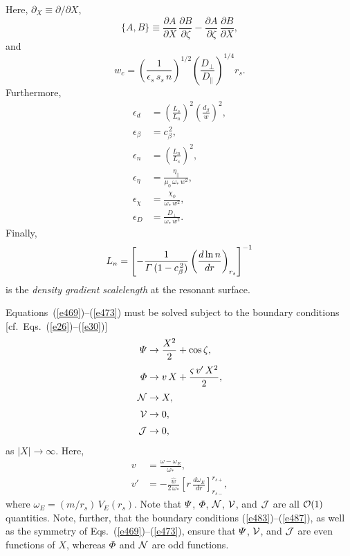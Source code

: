 \documentclass[12pt,prb,aps]{revtex4-1}
\begin{document}
Here,  $\partial_X\equiv \partial/\partial X$, 
\begin{equation}
\{A,B\} \equiv \frac{\partial A}{\partial X}\,\frac{\partial B}{\partial\zeta} - \frac{\partial A}{\partial \zeta}\,\frac{\partial B}{\partial X},
\end{equation}
and
\begin{equation}
w_c = \left(\frac{1}{\epsilon_s\,s_s\,n}\right)^{1/2}\left(\frac{D_\perp}{D_\parallel}\right)^{1/4}r_s.
\end{equation}
Furthermore,
\begin{align}
\epsilon_d &= \left(\frac{L_s}{L_n}\right)^2\left(\frac{d_\beta}{w}\right)^2,\label{e479}\\[0.5ex]
\epsilon_\beta &= c_\beta^{\,2},\label{e480}\\[0.5ex]
\epsilon_n&= \left(\frac{L_n}{L_s}\right)^2,\\[0.5ex]
\epsilon_\eta &= \frac{\eta_\parallel}{\mu_0\,\omega_\ast\,w^2},\label{e481}\\[0.5ex]
\epsilon_\chi &= \frac{\chi_\phi}{\omega_\ast\,w^2},\label{e482}\\[0.5ex]
\epsilon_D &= \frac{D_\perp}{\omega_\ast\,w^2}.
\end{align}
Finally,
\begin{equation}
L_n= \left[-\frac{1}{{\mit\Gamma}\,(1-c_\beta^{\,2})}\left(\frac{d\ln n}{dr}\right)_{r_s}\right]^{-1}
\end{equation}
is the {\em density gradient scalelength}\/  at the resonant surface. 

Equations~(\ref{e469})--(\ref{e473}) must be solved subject to the boundary conditions [cf.\ Eqs.~(\ref{e26})--(\ref{e30})] 
\begin{align}
{\mit\Psi}&\rightarrow \frac{X^{2}}{2} + \cos\zeta,\label{e483}\\[0.5ex]
{\mit\Phi} &\rightarrow v\,X +\frac{\varsigma\,v'\,X^{2}}{2},\label{e484}\\[0.5ex]
{\cal N}&\rightarrow X,\label{e486}\\[0.5ex]
{\cal V}&\rightarrow 0,\label{e486a}\\[0.5ex]
{\cal J}& \rightarrow 0,\label{e487}
\end{align}
as $|X|\rightarrow\infty$.  Here,
\begin{align}
v &= \frac{\omega-\omega_E}{\omega_\ast},\label{e488}\\[0.5ex]
v' &= -\frac{\hat{w}}{2\,\omega_\ast}\left[r\,\frac{d\omega_E}{dr}\right]_{r_{s-}}^{r_{s+}},\label{e489}
\end{align}
where $\omega_E= (m/r_s)\,V_E(r_s)$. 
Note that ${\mit\Psi}$, ${\mit\Phi}$, ${\cal N}$, ${\cal V}$, and ${\cal J}$ are all ${\cal O}(1)$ quantities.
Note, further,  that the boundary conditions (\ref{e483})--(\ref{e487}),
as well as the symmetry of Eqs.~(\ref{e469})--(\ref{e473}), ensure that ${\mit\Psi}$, ${\cal V}$, and
${\cal J}$ are even functions of $X$, whereas ${\mit\Phi}$ and ${\cal N}$ are odd functions. 
\end{document}
